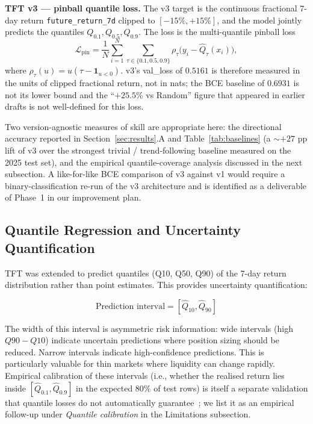 \documentclass[conference]{IEEEtran}
\begin{document}
\textbf{TFT v3 --- pinball quantile loss.} The v3 target is the continuous fractional 7-day return \texttt{future\_return\_7d} clipped to $[-15\%, +15\%]$, and the model jointly predicts the quantiles $Q_{0.1}, Q_{0.5}, Q_{0.9}$. The loss is the multi-quantile pinball loss
$$
\mathcal{L}_{\mathrm{pin}} = \frac{1}{N} \sum_{i=1}^{N} \sum_{\tau \in \{0.1, 0.5, 0.9\}} \rho_\tau\bigl(y_i - \hat{Q}_\tau(x_i)\bigr),
$$
where $\rho_\tau(u) = u(\tau - \mathbf{1}_{u<0})$. v3's val\_loss of $0.5161$ is therefore measured in the units of clipped fractional return, not in nats; the BCE baseline of $0.6931$ is not its lower bound and the ``$+25.5\%$ vs Random'' figure that appeared in earlier drafts is not well-defined for this loss.

Two version-agnostic measures of skill are appropriate here: the directional accuracy reported in Section~\ref{sec:results}.A and Table~\ref{tab:baselines} (a $\sim +27$ pp lift of v3 over the strongest trivial / trend-following baseline measured on the 2025 test set), and the empirical quantile-coverage analysis discussed in the next subsection. A like-for-like BCE comparison of v3 against v1 would require a binary-classification re-run of the v3 architecture and is identified as a deliverable of Phase~1 in our improvement plan.

\subsection{Quantile Regression and Uncertainty Quantification}

TFT was extended to predict quantiles (Q10, Q50, Q90) of the 7-day return distribution rather than point estimates. This provides uncertainty quantification:

$$\text{Prediction interval} = [\hat{Q}_{10}, \hat{Q}_{90}]$$

The width of this interval is asymmetric risk information: wide intervals (high $Q90 - Q10$) indicate uncertain predictions where position sizing should be reduced. Narrow intervals indicate high-confidence predictions. This is particularly valuable for thin markets where liquidity can change rapidly. Empirical calibration of these intervals (i.e., whether the realised return lies inside $[\hat{Q}_{0.1}, \hat{Q}_{0.9}]$ in the expected $80\%$ of test rows) is itself a separate validation that quantile losses do not automatically guarantee~\cite{ref:kuleshov,ref:confidence_calibration}; we list it as an empirical follow-up under \emph{Quantile calibration} in the Limitations subsection.
\end{document}
